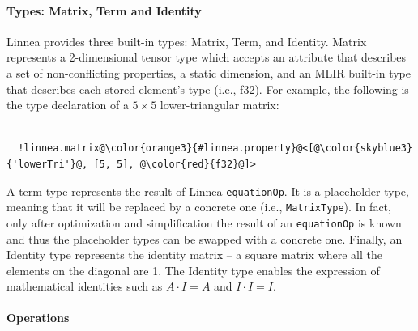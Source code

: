 \documentclass[conference]{IEEEtran}
\begin{document}
\paragraph{Types: Matrix, Term and Identity}
Linnea provides three built-in types: Matrix, Term, and Identity. Matrix
represents a 2-dimensional tensor type which accepts an attribute that
describes a set of non-conflicting properties, a static dimension, and an MLIR
built-in type that describes each stored element's type (i.e., f32). 
For example, the following is the type declaration of a $5\times5$ lower-triangular matrix:
\begin{verbatim}

  !linnea.matrix@\color{orange3}{#linnea.property}@<[@\color{skyblue3}{'lowerTri'}@, [5, 5], @\color{red}{f32}@]>

\end{verbatim}
A term type
represents the result of Linnea \texttt{equationOp}. It is a placeholder type,
meaning that it will be replaced by a concrete one (i.e., \texttt{MatrixType}).
In fact, only after optimization and simplification the result of an
\texttt{equationOp} is known and thus the placeholder types can be swapped with
a concrete one. Finally, an Identity type represents the identity matrix -- a
square matrix where all the elements on the diagonal are 1. The Identity type
enables the expression of mathematical identities such as $A \cdot I = A$ and $I \cdot I =
I$.


\paragraph{Operations}
\end{document}
